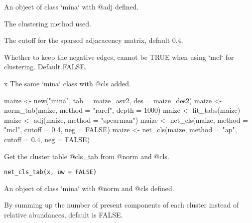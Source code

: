 \documentclass[a4paper]{book}
\begin{document}
%
\begin{Arguments}
\begin{ldescription}
\item[\code{x}] An object of class `mina` with @adj defined.

\item[\code{method}] The clustering method used.

\item[\code{cutoff}] The cutoff for the sparsed adjacacency matrix, default 0.4.

\item[\code{neg}] Whether to keep the negative edges, cannot be TRUE when using
`mcl` for clustering. Default FALSE.
\end{ldescription}
\end{Arguments}
%
\begin{Value}
x The same `mina` class with @cls added.
\end{Value}
%
\begin{Examples}
\begin{ExampleCode}
maize <- new("mina", tab = maize_asv2, des = maize_des2)
maize <- norm_tab(maize, method = "raref", depth = 1000)
maize <- fit_tabs(maize)
maize <- adj(maize, method = "spearman")
maize <- net_cls(maize, method = "mcl", cutoff = 0.4, neg = FALSE)
maize <- net_cls(maize, method = "ap", cutoff = 0.4, neg = FALSE)
\end{ExampleCode}
\end{Examples}
%
\begin{Description}\relax
Get the cluster table @cls\_tab from @norm and @cls.
\end{Description}
%
\begin{Usage}
\begin{verbatim}
net_cls_tab(x, uw = FALSE)
\end{verbatim}
\end{Usage}
%
\begin{Arguments}
\begin{ldescription}
\item[\code{x}] An object of class `mina` with @norm and @cls defined.

\item[\code{uw}] By summing up the number of present components of each cluster
instead of relative abundances, default is FALSE.
\end{ldescription}
\end{Arguments}
\end{document}
